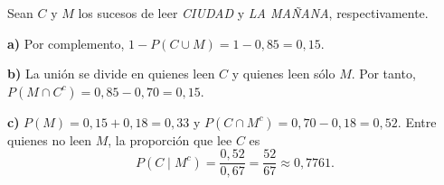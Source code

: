 Sean $C$ y $M$ los sucesos de leer \textit{CIUDAD} y \textit{LA MAÑANA}, respectivamente.

\textbf{a)} Por complemento, $1-P(C\cup M)=1-0{,}85=\boxed{0{,}15}$.

\textbf{b)} La unión se divide en quienes leen $C$ y quienes leen sólo $M$. Por tanto, $P(M\cap C^c)=0{,}85-0{,}70=\boxed{0{,}15}$.

\textbf{c)} $P(M)=0{,}15+0{,}18=0{,}33$ y $P(C\cap M^c)=0{,}70-0{,}18=0{,}52$. Entre quienes no leen $M$, la proporción que lee $C$ es
\[
P(C\mid M^c)=\frac{0{,}52}{0{,}67}=\boxed{\frac{52}{67}}\approx0{,}7761.
\]

